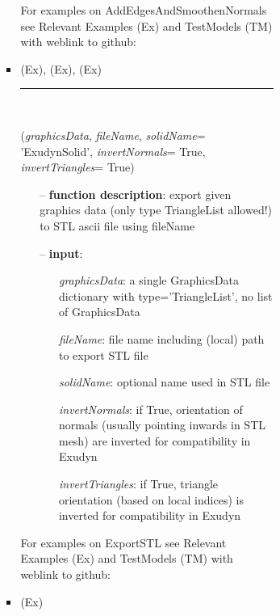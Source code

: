 \begin{itemize}[leftmargin=1.4cm]
\begin{itemize}[leftmargin=1.4cm]
\begin{itemize}[leftmargin=1.4cm]
\begin{itemize}[leftmargin=0.5cm]
\begin{itemize}[leftmargin=1.4cm]
\begin{itemize}[leftmargin=1.4cm]
\begin{itemize}[leftmargin=0.5cm]
\begin{itemize}[leftmargin=1.4cm]
%
%
\noindent For examples on AddEdgesAndSmoothenNormals see Relevant Examples (Ex) and TestModels (TM) with weblink to github:
\bi
 \item \footnotesize {} (Ex), 
 (Ex), 
 (Ex)
\ei

%
\noindent\rule{8cm}{0.75pt}\vspace{1pt} \\ 
\begin{flushleft}
\label{sec:graphics:ExportSTL}
({\it graphicsData}, {\it fileName}, {\it solidName}= 'ExudynSolid', {\it invertNormals}= True, {\it invertTriangles}= True)
\end{flushleft}
\setlength{\itemindent}{0.7cm}
\begin{itemize}[leftmargin=0.7cm]
\item[--]
{\bf function description}: export given graphics data (only type TriangleList allowed!) to STL ascii file using fileName
\item[--]
{\bf input}: \vspace{-6pt}
\begin{itemize}[leftmargin=1.2cm]
\setlength{\itemindent}{-0.7cm}
\item[]{\it graphicsData}: a single GraphicsData dictionary with type='TriangleList', no list of GraphicsData
\item[]{\it fileName}: file name including (local) path to export STL file
\item[]{\it solidName}: optional name used in STL file
\item[]{\it invertNormals}: if True, orientation of normals (usually pointing inwards in STL mesh) are inverted for compatibility in Exudyn
\item[]{\it invertTriangles}: if True, triangle orientation (based on local indices) is inverted for compatibility in Exudyn
\end{itemize}
\vspace{12pt}\end{itemize}
%
%
\noindent For examples on ExportSTL see Relevant Examples (Ex) and TestModels (TM) with weblink to github:
\bi
 \item \footnotesize {} (Ex)
\ei


\end{itemize}
\end{itemize}
\end{itemize}
\end{itemize}
\end{itemize}
\end{itemize}
\end{itemize}
\end{itemize}
